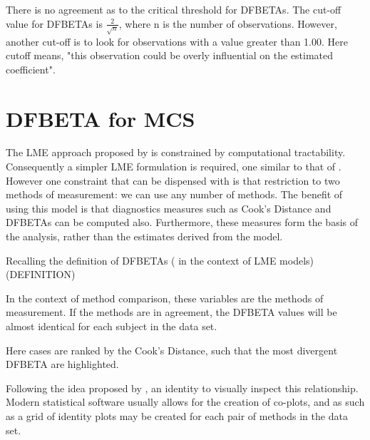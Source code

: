 \documentclass[12pt, a4paper]{report}
\theoremstyle{plain}
\theoremstyle{definition}
\theoremstyle{remark}
\begin{document}




There is no agreement as to the critical threshold for DFBETAs. The cut-off value for DFBETAs is $\frac{2}{\sqrt{n}}$, where n is the number of observations. 
However, another cut-off is to look for observations with a value greater than 1.00. Here cutoff means, 
"this observation could be overly influential on the estimated coefficient".

\section{DFBETA for MCS}
The LME approach proposed by \citet{ARoy2009} is constrained by computational tractability. 
Consequently a simpler LME formulation is required, one similar to that of \citet{BXC2008}. However one constraint that can be dispensed with is that restriction to 
two methods of measurement: we can use any number of methods.
The benefit of using this model is that diagnostics measures such as Cook's Distance and DFBETAs can be computed also. Furthermore, these measures
form the basis of the analysis, rather than the estimates derived from the model.

Recalling the definition of DFBETAs ( in the context of LME models) (DEFINITION)

In the context of method comparison, these variables are the methods of measurement. If the methods are in agreement, the DFBETA values will be almost identical for each subject in
the data set. 

Here cases are ranked by the Cook's Distance, such that the most divergent DFBETA are highlighted.



Following the idea proposed by \citet{BA86}, an identity to visually inspect this relationship. Modern statistical software usually allows for the creation of co-plots, and as such as
a grid of identity plots may be created for each pair of methods in the data set.

\end{document}
